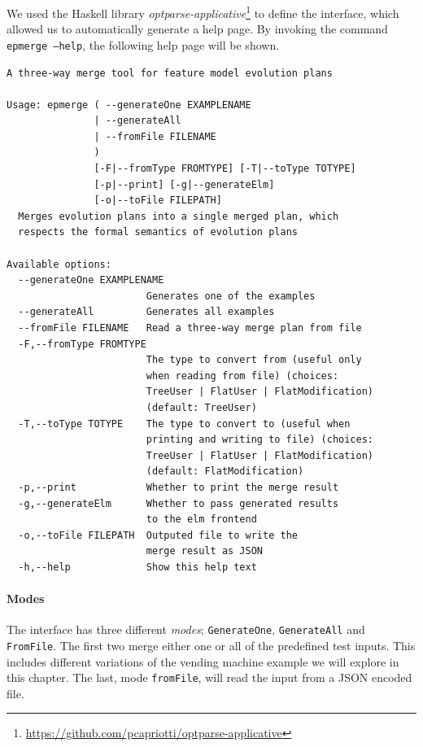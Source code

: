 \documentclass[a4paper,english]{ifimaster}
\begin{document}
We used the Haskell library \textit{optparse-applicative}\footnote{\url{https://github.com/pcapriotti/optparse-applicative}} to define the interface, which allowed us to automatically generate a help page. By invoking the command \texttt{epmerge --help}, the following help page will be shown.

\begin{verbatim}
A three-way merge tool for feature model evolution plans

Usage: epmerge ( --generateOne EXAMPLENAME 
               | --generateAll 
               | --fromFile FILENAME
               )
               [-F|--fromType FROMTYPE] [-T|--toType TOTYPE] 
               [-p|--print] [-g|--generateElm] 
               [-o|--toFile FILEPATH]
  Merges evolution plans into a single merged plan, which 
  respects the formal semantics of evolution plans

Available options:
  --generateOne EXAMPLENAME
                        Generates one of the examples
  --generateAll         Generates all examples
  --fromFile FILENAME   Read a three-way merge plan from file
  -F,--fromType FROMTYPE   
                        The type to convert from (useful only 
                        when reading from file) (choices: 
                        TreeUser | FlatUser | FlatModification) 
                        (default: TreeUser)
  -T,--toType TOTYPE    The type to convert to (useful when 
                        printing and writing to file) (choices: 
                        TreeUser | FlatUser | FlatModification) 
                        (default: FlatModification)
  -p,--print            Whether to print the merge result
  -g,--generateElm      Whether to pass generated results 
                        to the elm frontend
  -o,--toFile FILEPATH  Outputed file to write the 
                        merge result as JSON
  -h,--help             Show this help text
\end{verbatim}

\paragraph{Modes}%
\label{par:modes}

The interface has three different \textit{modes}; \texttt{GenerateOne}, \texttt{GenerateAll} and \texttt{FromFile}. The first two merge either one or all of the predefined test inputs. This includes different variations of the vending machine example we will explore in this chapter. The last, mode \texttt{fromFile}, will read the input from a JSON encoded file.
\end{document}
